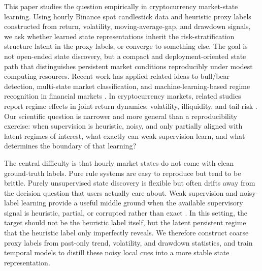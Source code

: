 \documentclass[a4paper,fleqn]{cas-dc}
\begin{document}
This paper studies the question empirically in cryptocurrency market-state learning. Using hourly Binance spot candlestick data and heuristic proxy labels constructed from return, volatility, moving-average-gap, and drawdown signals, we ask whether learned state representations inherit the risk-stratification structure latent in the proxy labels, or converge to something else. The goal is not open-ended state discovery, but a compact and deployment-oriented state path that distinguishes persistent market conditions reproducibly under modest computing resources. Recent work has applied related ideas to bull/bear detection, multi-state market classification, and machine-learning-based regime recognition in financial markets \cite{oelschlager2023bullbear,wang2021bearbull,nyberg2013bearbull,koukorinis2025regime}. In cryptocurrency markets, related studies report regime effects in joint return dynamics, volatility, illiquidity, and tail risk \cite{figatalamanca2021crypto,ardia2019bitcoinvol,tan2021bitcoinmsgarch,agakishiev2025forecasting}. Our scientific question is narrower and more general than a reproducibility exercise: when supervision is heuristic, noisy, and only partially aligned with latent regimes of interest, what exactly can weak supervision learn, and what determines the boundary of that learning?

The central difficulty is that hourly market states do not come with clean ground-truth labels. Pure rule systems are easy to reproduce but tend to be brittle. Purely unsupervised state discovery is flexible but often drifts away from the decision question that users actually care about. Weak supervision and noisy-label learning provide a useful middle ground when the available supervisory signal is heuristic, partial, or corrupted rather than exact \cite{ratner2020snorkel,zhang2022programmatic,zhou2018weakly,natarajan2013noisy,frenay2014labelnoise,song2023noisylabels}. In this setting, the target should not be the heuristic label itself, but the latent persistent regime that the heuristic label only imperfectly reveals. We therefore construct coarse proxy labels from past-only trend, volatility, and drawdown statistics, and train temporal models to distill these noisy local cues into a more stable state representation.
\end{document}
